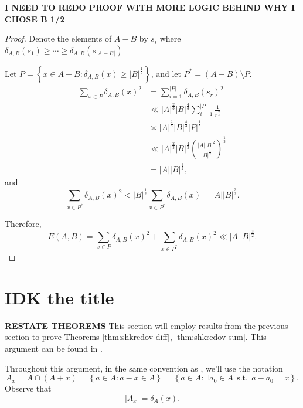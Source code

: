 \documentclass[12pt,reqno]{amsart}
\begin{document}
\textbf{I NEED TO REDO PROOF WITH MORE LOGIC BEHIND WHY I CHOSE B 1/2}
\begin{proof}
Denote the elements of \(A-B\) by \(s_{i} \) where \(\delta_{A,B} (s_1) \geq \cdots \geq \delta_{A,B} (s _{\left\lvert A-B \right\rvert } )\)

Let \(P = \left\{ x \in A - B : \delta_{A,B} (x) \geq \left\lvert B \right\rvert ^{\frac{1}{2} } \right\} \), and let \(P ^{*} = \left( A - B \right) \setminus P\).
\begin{align*}
    \sum _{x \in P} \delta_{A,B} (x)^{2} & =  \sum_{i=1}^{\left\lvert P \right\rvert } \delta_{A,B} (s _{r} )^{2}\\
    & \ll \left\lvert A \right\rvert ^{\frac{2}{3} } \left\lvert B \right\rvert ^{\frac{4}{3} } \sum_{i=1}^{\left\lvert P \right\rvert } \frac{1}{r^{\frac{2}{3} }} \\
    & \asymp \left\lvert A \right\rvert ^{\frac{2}{3} } \left\lvert B \right\rvert ^{\frac{4}{3} } \left\lvert P \right\rvert ^{\frac{1}{3} }\\
    & \ll \left\lvert A \right\rvert ^{\frac{2}{3} } \left\lvert B \right\rvert ^{\frac{4}{3} } \left( \frac{\left\lvert A \right\rvert \left\lvert B \right\rvert ^{2}}{\left\lvert B \right\rvert ^{\frac{1}{2} }}  \right) ^{\frac{1}{3} }\\
    & = \left\lvert A \right\rvert \left\lvert B \right\rvert ^{\frac{3}{2} },
\end{align*}
and
\[
    \sum _{x \in P^{*}} \delta_{A,B} (x)^{2} < \left\lvert B \right\rvert ^{\frac{1}{2} } \sum _{x \in P^{*}} \delta_{A,B} (x) = \left\lvert A \right\rvert \left\lvert B \right\rvert ^{\frac{3}{2} }
.\]

Therefore,
\[
    E(A,B) = \sum _{x \in P} \delta_{A,B} (x)^{2} + \sum _{x \in P ^{*}} \delta_{A,B} (x)^{2} \ll \left\lvert A \right\rvert \left\lvert B \right\rvert ^{\frac{3}{2} } 
.\]
\end{proof}

\section{ \textbf{IDK the title }}
\textbf{RESTATE THEOREMS} 
This section will employ results from the previous section to prove Theorems \ref{thm:shkredov-diff}, \ref{thm:shkredov-sum}.
This argument can be found in \cite{shkredov}.

Throughout this argument, in the same convention as \cite{shkredov}, we'll use the
notation
\[
    A_{x} = A \cap \left( A + x \right) = \left\{ a \in A : a - x \in A \right\} = \left\{ a \in A : \exists a_0 \in A ~~\text{s.t.}~~ a - a_0 = x \right\} 
.\]
Observe that
\[
    \left\lvert A_{x}  \right\rvert = \delta_{A} (x) 
.\]
\end{document}
